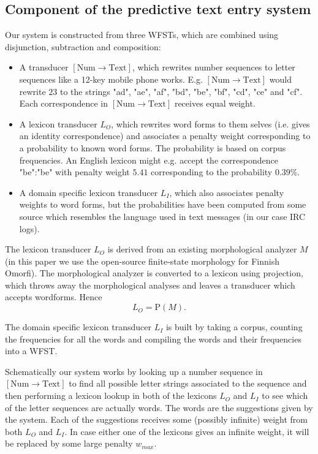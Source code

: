 \documentclass[a4paper,conference]{IEEEtran}
\begin{document}
\subsection{Component of the predictive text entry system}

Our system is constructed from three WFSTs, which are combined using
disjunction, subtraction and composition:

\begin{itemize}
\item A transducer $[\mathrm{Num}\rightarrow\mathrm{Text}]$, which
  rewrites number sequences to letter sequences like a 12-key mobile phone
  works. E.g. $[\mathrm{Num}\rightarrow\mathrm{Text}]$ would rewrite
  $23$ to the strings "ad", "ae", "af", "bd", "be", "bf", "cd", "ce"
  and "cf". Each correspondence in $[\mathrm{Num}\rightarrow\mathrm{Text}]$
  receives equal weight.
\item A lexicon transducer $L_O$, which rewrites word forms to them
  selves (i.e. gives an identity correspondence) and associates a
  penalty weight corresponding to a probability to known word
  forms. The probability is based on corpus frequencies. An English
  lexicon might e.g. accept the correspondence "be":"be" with penalty
  weight $5.41$ corresponding to the probability $0.39\%$.
\item A domain specific lexicon transducer $L_I$, which also
  associates penalty weights to word forms, but the probabilities have
  been computed from some source which resembles the language used in
  text messages (in our case IRC logs).
\end{itemize}

The lexicon transducer $L_O$ is derived from an existing morphological
analyzer $M$ (in this paper we use the open-source finite-state
morphology for Finnish Omorfi). The morphological analyzer is
converted to a lexicon using projection, which throws away the
morphological analyses and leaves a transducer which accepts
wordforms. Hence
\begin{equation}L_O = \mathrm{P}(M)\text{.}\end{equation}

The domain specific lexicon transducer $L_I$ is built by taking a
corpus, counting the frequencies for all the words and compiling the
words and their frequencies into a WFST.

Schematically our system works by looking up a number sequence in
$[\mathrm{Num}\rightarrow\mathrm{Text}]$ to find all possible letter
strings associated to the sequence and then performing a lexicon
lookup in both of the lexicons $L_O$ and $L_I$ to see which of the
letter sequences are actually words. The words are the suggestions
given by the system. Each of the suggestions receives some (possibly
infinite) weight from both $L_O$ and $L_I$. In case either one of the
lexicons gives an infinite weight, it will be replaced by some large
penalty $w_{max}$. 
\end{document}
